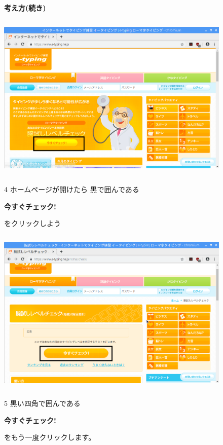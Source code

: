 \documentclass[a4paper,12pt]{jarticle}
\begin{document}
\begin{figure}
  \textbf{考え方(続き)}



  \centering

  \includegraphics[width=12.294cm,height=8.091cm]{textbook-img087.png}


  \begin{minipage}{4.252cm}
    4 ホームページが開けたら
    黒で囲んである

    \textbf{今すぐチェック!}

    をクリックしよう

  \end{minipage}
\end{figure}





\begin{figure}
  \centering
  \includegraphics[width=12.162cm,height=8.005cm]{textbook-img088.png}

  \begin{minipage}{4.252cm}
    5 黒い四角で囲んである

    \textbf{今すぐチェック!}

    をもう一度クリックします。
  \end{minipage}
\end{figure}
\end{document}
